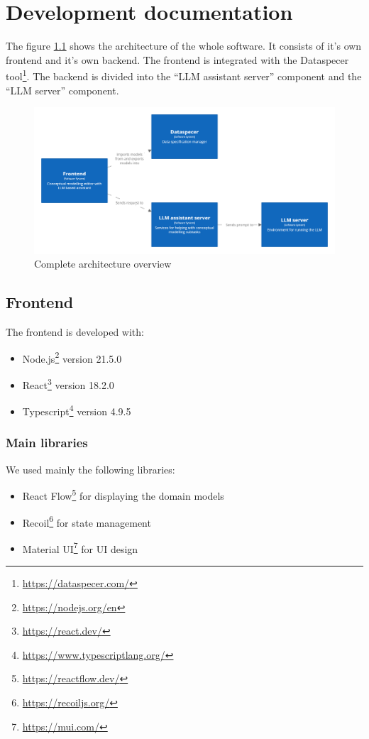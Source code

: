 \chapter{Development documentation}

The figure \ref{fig:complete_overview} shows the architecture of the whole software. It consists of it's own frontend and it's own backend. The frontend is integrated with the Dataspecer tool\footnote{\url{https://dataspecer.com/}}. The backend is divided into the ``LLM assistant server'' component and the ``LLM server'' component.

\begin{figure}[!h]
    \includegraphics[scale=0.20]{../docs/images/architecture/complete-overview.png}
    \caption{\centering Complete architecture overview}
    \label{fig:complete_overview}
\end{figure}

\section{Frontend}

\noindent{}The frontend is developed with:
\begin{itemize}
\item Node.js\footnote{\url{https://nodejs.org/en}} version 21.5.0
\item React\footnote{\url{https://react.dev/}} version 18.2.0
\item Typescript\footnote{\url{https://www.typescriptlang.org/}} version 4.9.5
\end{itemize}


\subsection{Main libraries}

\noindent{}We used mainly the following libraries:
\begin{itemize}
\item React Flow\footnote{\url{https://reactflow.dev/}} for displaying the domain models
\item Recoil\footnote{\url{https://recoiljs.org/}} for state management
\item Material UI\footnote{\url{https://mui.com/}} for UI design
\end{itemize}



